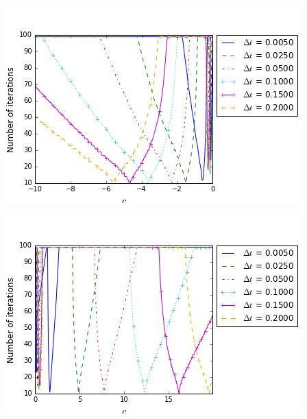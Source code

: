 \begingroup
\begin{minipage}{.5\linewidth}
\begin{center}
	\includegraphics[scale=.45]{figures/FinalFigures/NiterxCoefVarDtdx250FinalVersionNMarshal.png}
\end{center}
\end{minipage}
\begin{minipage}{.5\linewidth}
\begin{center}
	\includegraphics[scale=.45]{figures/FinalFigures/NiterxCoefVarDtdx250FinalVersionPMarshal.png}
\end{center}
\end{minipage}

